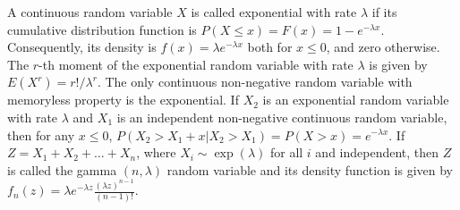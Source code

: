  A continuous random variable $X$ is called exponential with rate $\lambda$ if its cumulative distribution function is $P(X \le x) = F(x) = 1-e^{-\lambda x}$. Consequently, its density is $f(x) = \lambda e^{-\lambda x}$ both for $x \le 0$, and zero otherwise.
 The $r$-th moment of the exponential random variable with rate $\lambda$ is given by $E(X^r) = r!/\lambda^r$.
 The only continuous non-negative random variable with memoryless property is the exponential.
 If $X_2$ is an exponential random variable with rate $\lambda$ and $X_1$ is an independent non-negative continuous random variable, then for any $x \le 0$, $P(X_2 > X_1 +x|X_2 > X_1) = P(X > x) = e^{-\lambda x}$.
 If $Z = X_1 + X_2 + \ldots + X_n$, where $X_i \sim \exp(\lambda)$ for all $i$ and independent, then $Z$ is called the gamma $(n, \lambda)$ random variable and its density function is given by $f_n(z) = \lambda e^{-\lambda z} \frac{(\lambda z)^{n-1}}{(n-1)!}$.